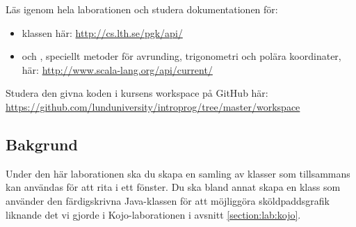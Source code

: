 

\Lab{\LabWeekFIVE}

\begin{Goals}

\end{Goals}

\begin{Preparations}
\item {}

\item Läs igenom hela laborationen och studera dokumentationen för:
\begin{itemize}[nolistsep,noitemsep]
\item klassen  här: \url{http://cs.lth.se/pgk/api/}

\item {} och , speciellt metoder för avrunding, trigonometri och polära koordinater, här:
\url{http://www.scala-lang.org/api/current/}
\end{itemize}

\item Studera den givna koden i kursens workspace på GitHub här:\\
\url{https://github.com/lunduniversity/introprog/tree/master/workspace}

\end{Preparations}

\subsection{Bakgrund}

Under den här laborationen ska du skapa en samling av klasser som tillsammans kan användas för att rita i ett fönster. Du ska bland annat skapa en klass  som använder den färdigskrivna Java-klassen  för att möjliggöra sköldpaddsgrafik liknande det vi gjorde i Kojo-laborationen i avsnitt \ref{section:lab:kojo}.


